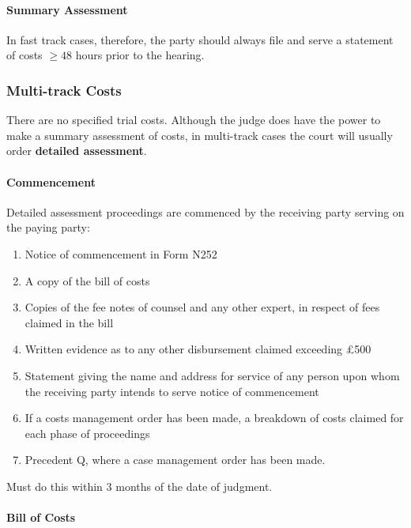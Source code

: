 \documentclass[
]{article}
\providecommand{\tightlist}{%
  \setlength{\itemsep}{0pt}\setlength{\parskip}{0pt}}
\begin{document}
\hypertarget{summary-assessment}{%
\paragraph{Summary Assessment}\label{summary-assessment}}

In fast track cases, therefore, the party should always file and serve a
statement of costs \(\geq 48\) hours prior to the hearing.

\hypertarget{multi-track-costs}{%
\subsubsection{Multi-track Costs}\label{multi-track-costs}}

There are no specified trial costs. Although the judge does have the
power to make a summary assessment of costs, in multi-track cases the
court will usually order \textbf{detailed assessment}.

\hypertarget{commencement}{%
\paragraph{Commencement}\label{commencement}}

Detailed assessment proceedings are commenced by the receiving party
serving on the paying party:

\begin{enumerate}
\def\labelenumi{\arabic{enumi}.}
\tightlist
\item
  Notice of commencement in Form N252
\item
  A copy of the bill of costs
\item
  Copies of the fee notes of counsel and any other expert, in respect of
  fees claimed in the bill
\item
  Written evidence as to any other disbursement claimed exceeding £500
\item
  Statement giving the name and address for service of any person upon
  whom the receiving party intends to serve notice of commencement
\item
  If a costs management order has been made, a breakdown of costs
  claimed for each phase of proceedings
\item
  Precedent Q, where a case management order has been made.
\end{enumerate}

Must do this within 3 months of the date of judgment.

\hypertarget{bill-of-costs}{%
\paragraph{Bill of Costs}\label{bill-of-costs}}
\end{document}
